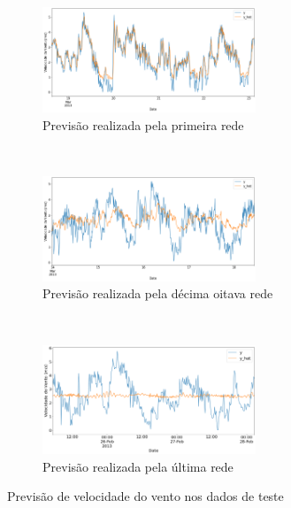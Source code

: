 
\begin{figure}[H]
	\centering
	\begin{subfigure}{\textwidth}
		\centering
		\includegraphics[width=0.7\textwidth]{../img/wind_pred_3m_0.png}
		\caption{Previsão realizada pela primeira rede}\label{fig:wind:pred1}
	\end{subfigure}
	\\ \vspace{1cm}
	\begin{subfigure}{\textwidth}
		\centering
		\includegraphics[width=0.7\textwidth]{../img/wind_pred_3m_18.png}
		\caption{Previsão realizada pela décima oitava rede}\label{fig:wind:pred18}
	\end{subfigure}
	\\ \vspace{1cm}
	\begin{subfigure}{\textwidth}
		\centering
		\includegraphics[width=0.7\textwidth]{../img/wind_pred_3m_-1.png}
		\caption{Previsão realizada pela última rede}\label{fig:wind:pred-1}
	\end{subfigure}
	\caption{Previsão de velocidade do vento nos dados de teste}\label{fig:wind:pred}
\end{figure}
